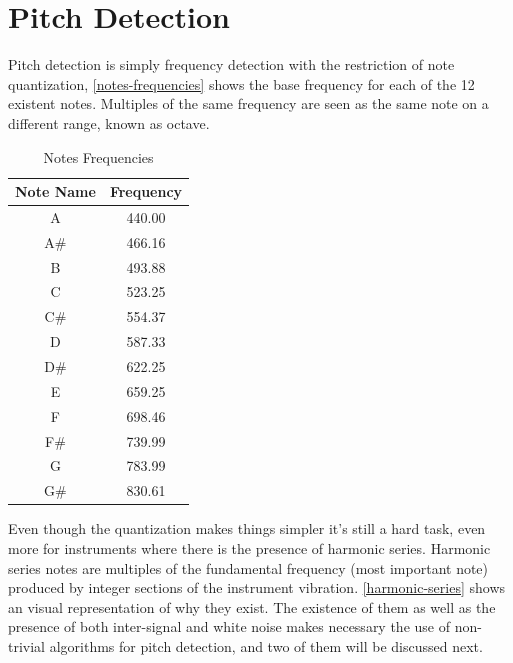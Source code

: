 \chapter{Pitch Detection}
\label{pitch-detection}

Pitch detection is simply frequency detection with the restriction of note quantization,
\autoref{notes-frequencies} shows the base frequency for each of the 12 existent
notes. Multiples of the same frequency are seen as the same note on a different
range, known as octave.
\begin{table}[htb]
  \begin{center}
    \ABNTEXreducedfont
    \caption[Notes Frequencies]{Notes Frequencies}
    \label{notes-frequencies}
    \begin{tabular}{c|c}
      \hline
      Note Name & Frequency\\
      \hline \hline
      A & 440.00 \\
      A\# & 466.16 \\
      B & 493.88 \\
      C & 523.25 \\
      C\# & 554.37 \\
      D & 587.33 \\
      D\# & 622.25 \\
      E & 659.25 \\
      F & 698.46 \\
      F\# & 739.99 \\
      G & 783.99 \\
      G\# & 830.61 \\
      \hline
    \end{tabular}
  \end{center}
\end{table}
Even though the quantization makes things simpler it's still a hard task, even
more for instruments where there is the presence of harmonic series. Harmonic
series notes are multiples of the fundamental frequency (most important
note) produced by integer sections of the instrument vibration. \autoref{harmonic-series}
shows an visual representation of why they exist. The existence of them as well
as the presence of both inter-signal and white noise makes necessary the use of
non-trivial algorithms for pitch detection, and two of them will be discussed next.

